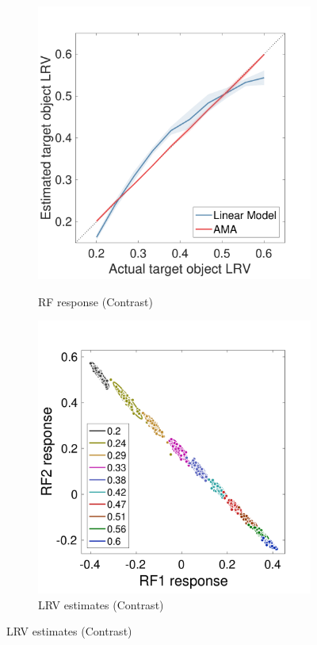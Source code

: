 \documentclass{jov}
\begin{document}
\begin{figure}
\begin{subfigure}[b]{0.22 \textwidth}
        \label{fig:case2RFResponseIsomer}
    \end{subfigure}
            \begin{subfigure}[b]{0.22 \textwidth}
        \caption{RF response (Contrast)}
        \includegraphics[width=\textwidth]{../FiguresDraft4/Figure11/Figure11_c.pdf}
        \label{fig:case2ContrastEstimates}
    \end{subfigure}
            \begin{subfigure}[b]{0.22 \textwidth}
        \caption{LRV estimates (Contrast)}
        \includegraphics[width=\textwidth]{../FiguresDraft4/Figure11/Figure11_d.pdf}

\end{subfigure}
\end{figure}
\end{document}
